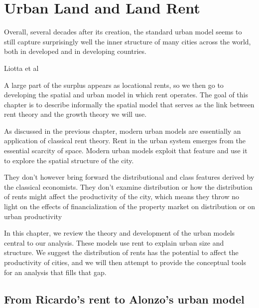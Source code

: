 \chapter{Urban Land and Land Rent} \label{chapter-space}

\epigraph{Overall, several decades after its creation, the standard urban model seems to still capture surprisingly well the inner structure of many cities across the world, both in developed and in developing countries.}{Liotta et al \cite{liottaTestingMonocentricStandard2022}}

A large part of the surplus appears as locational rents, so we then go to developing the spatial and urban model in which rent operates.  
The goal of this chapter is to describe informally the spatial model that serves as the link between rent theory and the growth theory we will use. 

As discussed in the previous chapter, modern urban models are essentially an application of classical rent theory. Rent in the urban system emerges from the essential scarcity of space. Modern urban models exploit that feature and use it to explore the spatial structure of the city.

They don't however bring forward the distributional and class features derived by the classical economists.  They don't examine distribution or how the distribution of rents might affect the productivity of the city, which means they throw no light on the effects of financialization of the property market on distribution or on urban productivity

In this chapter, we review the theory and development of the urban models central to our analysis. These models use rent to explain urban size and structure. 
We suggest the distribution of rents has the potential to affect the productivity of cities, and we will then attempt to provide the conceptual tools for an analysis that fills that gap.




\section{From Ricardo's rent to Alonzo's urban model} 

